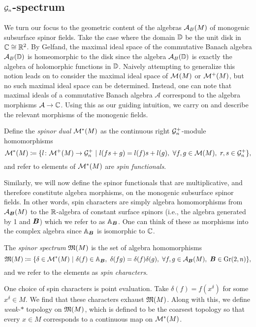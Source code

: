 \subsection{$\mathcal{G}_n$-spectrum}

We turn our focus to the geometric content of the algebras $\mathcal{A}_{B}(M)$ of monogenic subsurface spinor fields. Take the case where the domain $\mathbb{D}$ be the unit disk in $\mathbb{C} \cong \mathbb{R}^2$.  By Gelfand, the maximal ideal space of the commutative Banach algebra $\mathcal{A}_{B}(\mathbb{D})$ is homeomorphic to the disk since the algebra $\mathcal{A}_{B}(\mathbb{D})$ is exactly the algebra of holomorphic functions in $\mathbb{D}$. Naively attempting to generalize this notion leads on to consider the maximal ideal space of $\mathcal{M}^{}(M)$ or $\mathcal{M}^{+}(M)$, but no such maximal ideal space can be determined. Instead, one can note that maximal ideals of a commutative Banach algebra $\mathcal{A}$ correspond to the algebra morphisms $\mathcal{A} \to \mathbb{C}$.  Using this as our guiding intuition, we carry on and describe the relevant morphisms of the monogenic fields.

\begin{definition}
    Define the \emph{spinor dual} $\mathcal{M}^*(M)$ as the continuous right $\mathcal{G}_n^+$-module homomorphisms
    \begin{equation}
        \mathcal{M}^*(M) \coloneqq \{ l \colon \mathcal{M}^+(M) \to \mathcal{G}_n^+ ~\vert~ l(fs+g) = l(f)s+l(g), ~\forall f,g \in \mathcal{M}(M), ~r,s \in \mathcal{G}_n^+ \},
    \end{equation}
    and refer to elements of $\mathcal{M}^*(M)$ are \emph{spin functionals}. 
    \end{definition}
Similarly, we will now define the spinor functionals that are multiplicative, and therefore constitute algebra morphisms, on the monogenic subsurface spinor fields. In other words, spin characters are simply algebra homomorphisms from $\mathcal{A}_{\boldsymbol{B}}(M)$ to the $\mathbb{R}$-algebra of constant surface spinors (i.e., the algebra generated by 1 and $\boldsymbol{B}$) which we refer to as $\mathbb{A}_{\boldsymbol{B}}$. One can think of these as morphisms into the complex algebra since $\mathbb{A}_{\boldsymbol{B}}$ is isomorphic to $\mathbb{C}$.
\begin{definition}
    The \emph{spinor spectrum} $\mathfrak{M}(M)$ is the set of algebra homomorphisms
    \[
        \mathfrak{M}(M) \coloneqq \{ \delta \in \mathcal{M}^*(M) ~\vert~ \delta(f) \in \mathbb{A}_{\boldsymbol{B}},~\delta(fg) = \delta(f)\delta(g),~ \forall f,g \in \mathcal{A}_{\boldsymbol{B}}(M),~  \boldsymbol{B} \in \operatorname{Gr}(2,n)\},
    \]
    and we refer to the elements as \emph{spin characters}.
\end{definition}
One choice of spin characters is point evaluation. Take $\delta(f)=f(x^\delta)$ for some $x^\delta \in M$. We find that these characters exhaust $\mathfrak{M}(M)$. Along with this, we define \emph{weak-$\ast$} topology on $\mathfrak{M}(M)$, which is defined to be the coarsest topology so that every $x \in M$ corresponds to a continuous map on $\mathcal{M}^*(M)$. 

